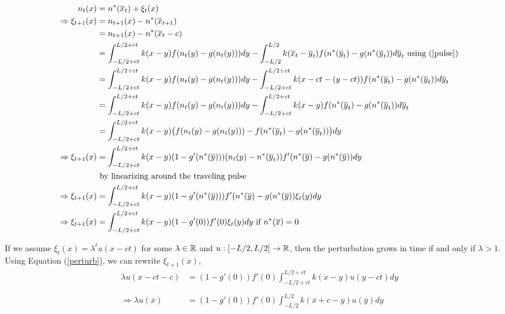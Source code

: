 \documentclass[12pt,english]{article}
\begin{document}
\begin{align}
n_t(x)&=n^*(\overline{x}_t)+\xi_t(x) \notag
\\ \Rightarrow \xi_{t+1}(x)&=n_{t+1}(x)-n^*(\overline{x}_{t+1}) \notag
\\&=n_{t+1}(x)-n^*(\overline{x}_{t}-c) \notag
\\ &=\int_{-L/2+ct}^{L/2+ct}k(x-y)f(n_t(y)-g(n_t(y)))dy-\int_{-L/2}^{L/2}k(\overline{x}_{t}-\overline{y}_t)f(n^*(\overline{y}_t)-g(n^*(\overline{y}_t))d\overline y_t \text{ using (\ref{pulse})} \notag
\\ &=\int_{-L/2+ct}^{L/2+ct}k(x-y)f(n_t(y)-g(n_t(y)))dy-\int_{-L/2+ct}^{L/2+ct}k(x-ct-(y-ct))f(n^*(\overline{y}_t)-g(n^*(\overline{y}_t))d\overline y_t \notag
\\ &=\int_{-L/2+ct}^{L/2+ct}k(x-y)f(n_t(y)-g(n_t(y)))dy-\int_{-L/2+ct}^{L/2+ct}k(x-y)f(n^*(\overline{y}_t)-g(n^*(\overline{y}_t))d\overline y_t \notag
\\ &=\int_{-L/2+ct}^{L/2+ct}k(x-y)\big(f(n_t(y)-g(n_t(y)))-f(n^*(\overline{y}_t)-g(n^*(\overline{y}_t))\big)dy \notag
\\ \Rightarrow \xi_{t+1}(x)&=\int_{-L/2+ct}^{L/2+ct}k(x-y)(1-g'(n^*(\overline{y})))(n_t(y)-n^*(\overline{y}_t))f'(n^*(\overline{y})-g(n^*(\overline{y}))dy \notag
\\& \text{ by linearizing around the traveling pulse} \notag
\\ \Rightarrow \xi_{t+1}(x)&=\int_{-L/2+ct}^{L/2+ct}k(x-y)(1-g'(n^*(\overline{y})))f'(n^*(\overline{y})-g(n^*(\overline{y}))\xi_t(y)dy \notag
\\ \Rightarrow \xi_{t+1}(x)&=\int_{-L/2+ct}^{L/2+ct}k(x-y)(1-g'(0))f'(0)\xi_t(y)dy \text{ if $n^*(\overline{x})=0$} \label{perturb}
\end{align}


If we assume $\xi_t(x)=\lambda^tu(x-ct)$ for some $\lambda\in{\mathbb{R}}$ and $u:[-L/2,L/2]\to{\mathbb{R}}$, then the perturbation grows in time if and only if $\lambda >1$.  Using Equation (\ref{perturb}), we can rewrite $\xi_{t+1}(x)$,
\begin{align*}
\lambda u(x-ct-c)&=(1-g'(0))f'(0)\int_{-L/2+ct}^{L/2+ct}k(x-y)u(y-ct)dy
\\ \\\Rightarrow \lambda u(\overline{x})&=(1-g'(0))f'(0)\int_{-L/2}^{L/2}k(\overline{x}+c-\overline{y})u(\overline{y})dy
\end{align*}
\end{document}
